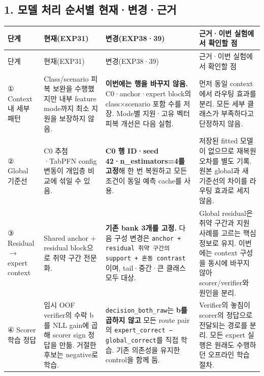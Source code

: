 \subsection{1. 모델 처리 순서별 현재·변경·근거}
\begingroup
\footnotesize
\begin{longtable}{>{\raggedright\arraybackslash}p{}>{\raggedright\arraybackslash}p{}>{\raggedright\arraybackslash}p{}>{\raggedright\arraybackslash}p{}}
\toprule
단계 & 현재(EXP31) & 변경(EXP38·39) & 근거·이번 실험에서 확인할 점 \\ \midrule
\endfirsthead
단계 & 현재(EXP31) & 변경(EXP38·39) & 근거·이번 실험에서 확인할 점 \\ \midrule
\endhead
{}① Context 내 세부 패턴 & Class/\allowbreak{}scenario 피복 보완을 수행했지만 내부 feature mode까지 최소 지원을 보장하지 않음. & \textbf{이번에는 행을 바꾸지 않음.} C0·anchor·expert block의 class×scenario 포함 수를 저장. Mode별 지원·고유 벡터 피복 개선은 다음 실험. & 먼저 동일 context에서 라우팅 효과를 분리. 모든 세부 클래스가 부족하다고 단정하지 않음. \\
{}② Global 기준선 & C0 추첨·TabPFN config 변동이 개입층 비교에 섞일 수 있음. & \textbf{C0 행 ID·seed 42·n\_\allowbreak{}estimators=\allowbreak{}4를 고정}해 한 번 복원하고 모든 조건이 동일 예측 cache를 사용. & 저장된 fitted 모델이 없으므로 재복원 오차를 별도 기록. 원본 global과 새 기준선의 차이를 라우팅 효과로 세지 않음. \\
{}③ Residual  \ensuremath{\rightarrow}  expert context & Shared anchor +\allowbreak{} residual block으로 취약 구간 전문화. & \textbf{기존 bank 3개를 고정.} 다음 구성 변경은 \texttt{anchor +\allowbreak{}\allowbreak{} residua\allowbreak{}l 취약 구간의\allowbreak{} support\allowbreak{} +\allowbreak{}\allowbreak{} 혼동 co\allowbreak{}ntrast}이며, tail·중간·큰 클래스 모두 대상. & Global residual은 취약 구간과 지원 사례를 고르는 핵심 정보로 유지. 이번에는 context 구성을 동시에 바꾸지 않아 scorer/\allowbreak{}verifier와 원인을 분리. \\
{}④ Scorer 학습 정답 & 임시 OOF verifier의 수락 b를 NLL gain에 곱해 scorer sign 정답을 만듦. 거절한 후보는 negative로 학습. & \texttt{decision\allowbreak{}\_\allowbreak{}\allowbreak{}both\_\allowbreak{}\allowbreak{}ra\allowbreak{}w}는 \textbf{b를 곱하지 않고} 모든 route pair의 \texttt{expert\_\allowbreak{}\allowbreak{}c\allowbreak{}orrect −\allowbreak{} global\_\allowbreak{}\allowbreak{}correct}를 직접 학습. 기존 의존성을 유지한 control을 함께 둠. & Verifier의 놓침이 scorer의 정답으로 전달되는 경로를 분리. 모든 expert 실행은 원래도 수행하던 오프라인 학습 절차. \\

\end{longtable}
